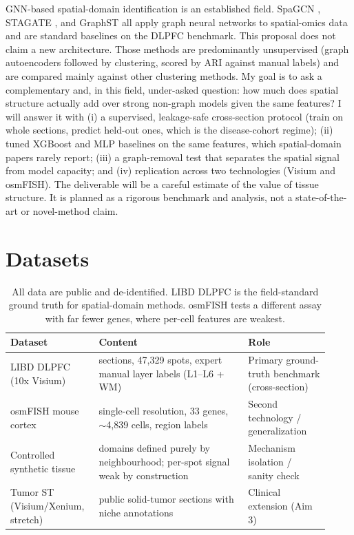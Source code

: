 \documentclass[11pt]{article}
\begin{document}
GNN-based spatial-domain identification is an established field. SpaGCN
\cite{hu2021}, STAGATE \cite{dong2022}, and GraphST \cite{long2023} all apply
graph neural networks to spatial-omics data and are standard baselines on the
DLPFC benchmark.
This proposal does not claim a new architecture. Those methods are predominantly
unsupervised (graph autoencoders followed by clustering, scored by ARI against
manual labels) and are compared mainly against other clustering methods. My
goal is to ask a complementary and, in this field, under-asked question: how
much does spatial structure actually add over strong non-graph models given the
same features? I will answer it with (i) a supervised, leakage-safe cross-section
protocol (train on whole sections, predict held-out ones, which is the
disease-cohort regime); (ii) tuned XGBoost and MLP baselines on the same features,
which spatial-domain papers rarely report; (iii) a graph-removal test that
separates the spatial signal from model capacity; and (iv) replication across two
technologies (Visium and osmFISH). The deliverable will be a careful estimate of
the value of tissue structure. It is planned as a rigorous benchmark and analysis,
not a state-of-the-art or novel-method claim.

\section{Datasets}

\begin{table}[H]
\centering\small
\begin{tabular}{>{\raggedright\arraybackslash}p{0.24\linewidth} >{\raggedright\arraybackslash}p{0.44\linewidth} >{\raggedright\arraybackslash}p{0.24\linewidth}}
\toprule
\rowcolor{sriblue}\color{white}\textbf{Dataset} & \color{white}\textbf{Content} & \color{white}\textbf{Role}\\
\midrule
\rowcolor{srirow} LIBD DLPFC (10x Visium) \cite{maynard2021,pardo2022} & 12 sections, 47{,}329 spots, expert manual layer labels (L1--L6 + WM) & Primary ground-truth benchmark (cross-section)\\
osmFISH mouse cortex \cite{codeluppi2018} & single-cell resolution, 33 genes, $\sim$4{,}839 cells, region labels & Second technology / generalization\\
\rowcolor{srirow} Controlled synthetic tissue & domains defined purely by neighbourhood; per-spot signal weak by construction & Mechanism isolation / sanity check\\
Tumor ST (Visium/Xenium, stretch) & public solid-tumor sections with niche annotations & Clinical extension (Aim 3)\\
\bottomrule
\end{tabular}
\caption{All data are public and de-identified. LIBD DLPFC is the field-standard
ground truth for spatial-domain methods. osmFISH tests a different assay with far
fewer genes, where per-cell features are weakest.}
\label{tab:data}
\end{table}
\end{document}

